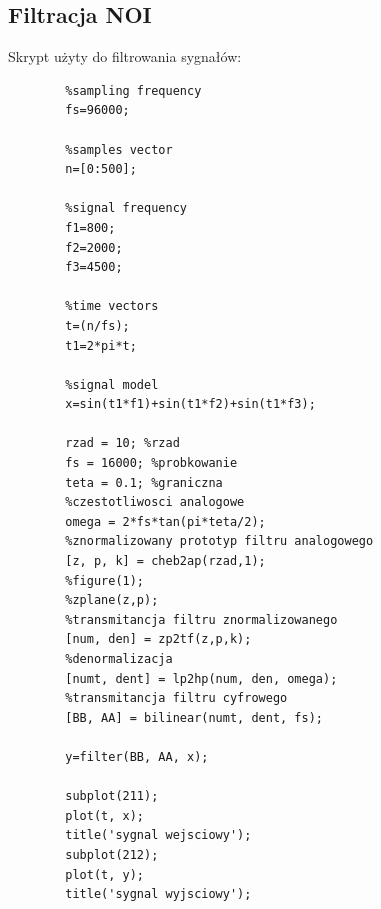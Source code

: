 \documentclass[12pt,titlepage]{report}
\begin{document}
\subsection{Filtracja NOI}
Skrypt użyty do filtrowania sygnałów:
\begin{multicols}{3}
	{
		\tiny
		\begin{verbatim}
		%sampling frequency
		fs=96000;
		
		%samples vector
		n=[0:500];
		
		%signal frequency
		f1=800;
		f2=2000;
		f3=4500;
		
		%time vectors
		t=(n/fs);
		t1=2*pi*t;
		
		%signal model
		x=sin(t1*f1)+sin(t1*f2)+sin(t1*f3);
		
		rzad = 10; %rzad
		fs = 16000; %probkowanie
		teta = 0.1; %graniczna
		%czestotliwosci analogowe
		omega = 2*fs*tan(pi*teta/2);
		%znormalizowany prototyp filtru analogowego
		[z, p, k] = cheb2ap(rzad,1);
		%figure(1);
		%zplane(z,p);
		%transmitancja filtru znormalizowanego
		[num, den] = zp2tf(z,p,k);
		%denormalizacja
		[numt, dent] = lp2hp(num, den, omega);
		%transmitancja filtru cyfrowego
		[BB, AA] = bilinear(numt, dent, fs);
		
		y=filter(BB, AA, x);
		
		subplot(211);
		plot(t, x);
		title('sygnal wejsciowy');
		subplot(212);
		plot(t, y);
		title('sygnal wyjsciowy');
		\end{verbatim}
	}
\end{multicols}
\end{document}
